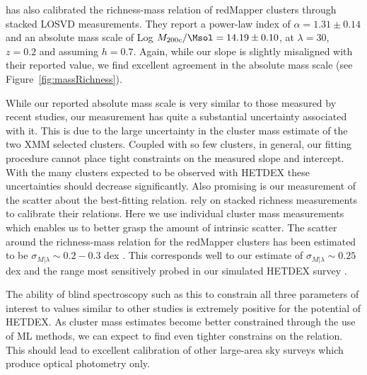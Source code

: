 \cite{Farahi2016} has also calibrated the richness-mass relation of redMapper clusters through stacked LOSVD measurements. They report a power-law index of $\alpha=1.31\pm0.14$ and an absolute mass scale of Log $M_{200c}/\Msol = 14.19\pm0.10$, at $\lambda=30$, $z=0.2$ and assuming $h=0.7$. Again, while our slope is slightly misaligned with their reported value, we find excellent agreement in the absolute mass scale (see Figure~\ref{fig:massRichness}).

While our reported absolute mass scale is very similar to those measured by recent studies, our measurement has quite a substantial uncertainty associated with it. This is due to the large uncertainty in the cluster mass estimate of the two XMM selected clusters. Coupled with so few clusters, in general, our fitting procedure cannot place tight constraints on the measured slope and intercept. With the many clusters expected to be observed with HETDEX these uncertainties should decrease significantly.  
Also promising is our measurement of the scatter about the best-fitting relation. \cite{Farahi2016, Simet2016} rely on stacked richness measurements to calibrate their relations. Here we use individual cluster mass measurements which enables us to better grasp the amount of intrinsic scatter. The scatter around the richness-mass relation for the redMapper clusters has been estimated to be $\sigma_{M|\lambda} \sim 0.2-0.3$ dex \citep{Rozo2014, Rozo2015}. This corresponds well to our estimate of $\sigma_{M|\lambda} \sim 0.25$ dex and the range most sensitively probed in our simulated HETDEX survey .

The ability of blind spectroscopy such as this to constrain all three parameters of interest to values similar to other studies is extremely positive for the potential of HETDEX. As cluster mass estimates become better constrained through the use of ML methods, we can expect to find even tighter constrains on the relation. This should lead to excellent calibration of other large-area sky surveys which produce optical photometry only. 

